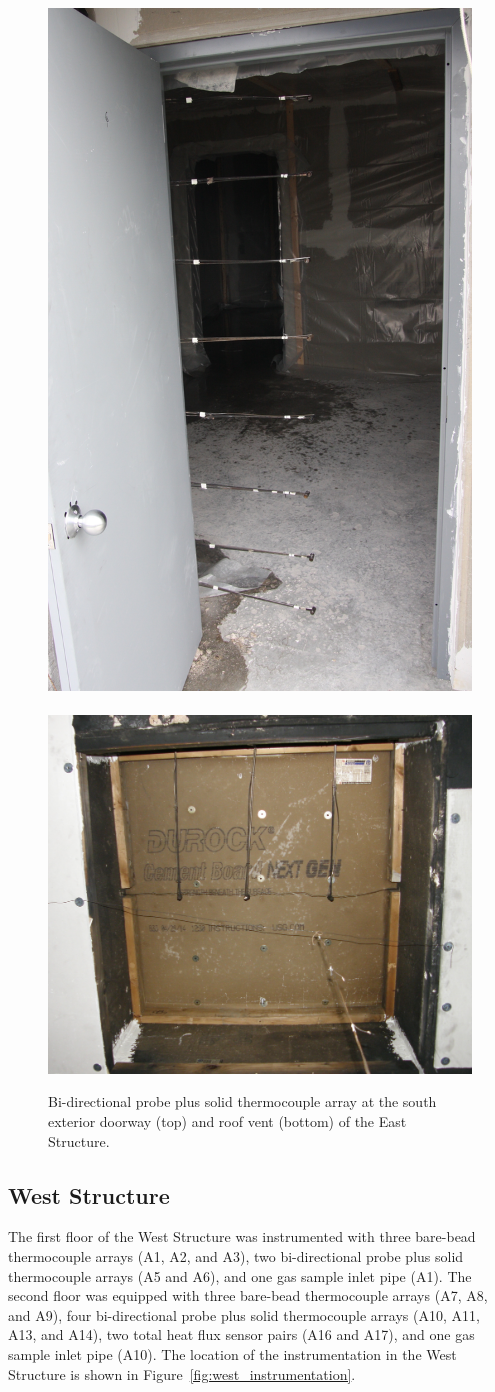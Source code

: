\begin{figure}[!h]
	\centering
	\includegraphics[width=0.35\columnwidth]{Figures/Pictures/doorway_BDPs}
	\\~\\
	\includegraphics[width=0.55\columnwidth]{Figures/Pictures/roof_vent_BDPs}
	\caption[Bi-directional probe plus solid thermocouple arrays in East Structure]{Bi-directional probe plus solid thermocouple array at the south exterior doorway (top) and roof vent (bottom) of the East Structure.}
	\label{fig:BDP_arrays}
\end{figure}
\FloatBarrier

\subsection{West Structure}
The first floor of the West Structure was instrumented with three bare-bead thermocouple arrays (A1, A2, and A3), two bi-directional probe plus solid thermocouple arrays (A5 and A6), and one gas sample inlet pipe (A1). The second floor was equipped with three bare-bead thermocouple arrays (A7, A8, and A9), four bi-directional probe plus solid thermocouple arrays (A10, A11, A13, and A14), two total heat flux sensor pairs (A16 and A17), and one gas sample inlet pipe (A10). The location of the instrumentation in the West Structure is shown in Figure~\ref{fig:west_instrumentation}.

